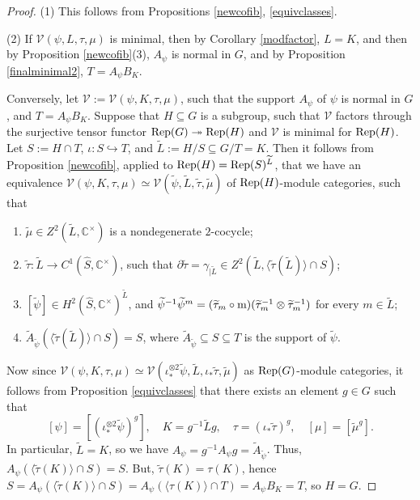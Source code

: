 \documentclass{amsart}
\theoremstyle{definition}
\newcommand{\Rep}{{\rm Rep}}
\newcommand{\V}{\mathscr{V}}
\newcommand{\ot}{\otimes}
\numberwithin{equation}{section}
\begin{document}
\begin{proof}
(1) This follows from Propositions \ref{newcofib}, \ref{equivclasses}.

(2) If $\V(\psi,L,\tau,\mu)$ is minimal, then by Corollary \ref{modfactor}, $L=K$, and then by Proposition \ref{newcofib}(3), $A_{\psi}$ is normal in $G$, and by Proposition \ref{finalminimal2}, $T=A_{\psi}B_K$.

Conversely, let $\V:=\V(\psi,K,\tau,\mu)$, such that the support $A_{\psi}$ of $\psi$ is normal in $G$, and $T=A_{\psi}B_K$. Suppose that $H\subseteq G$ is a subgroup, such that $\V$ factors through the surjective tensor functor $\Rep(G)\twoheadrightarrow \Rep(H)$ and $\V$ is minimal for $\Rep(H)$. Let $S:=H\cap T$, $\iota:S\hookrightarrow T$, and $\widetilde{L}:=H/S\subseteq G/T=K$. Then it follows from Proposition \ref{newcofib}, applied to $\Rep(H)=\Rep(S)^{\widetilde{L}}$, that we have an equivalence $\V(\psi,K,\tau,\mu)\simeq\V(\widetilde{\psi},\widetilde{L},\widetilde{\tau},\widetilde{\mu})$ of $\Rep(H)$-module categories, such that 
\begin{enumerate}
\item
$\widetilde{\mu}\in Z^2(\widetilde{L},\mathbb{C}^{\times})$ is a nondegenerate $2$-cocycle; 
\item
$\widetilde{\tau}: \widetilde{L}\to C^1(\widehat{S},\mathbb{C}^{\times})$,
such that $\partial\widetilde{\tau}=\gamma_{\mid \widetilde{L}}\in Z^2(\widetilde{L},\langle \widetilde{\tau}(\widetilde{L})\rangle\cap S)$;
\item
$[\widetilde{\psi}]\in H^2(\widehat{S},\mathbb{C}^{\times})^{\widetilde{L}}$, and $\widetilde{\psi}^{-1}\widetilde{\psi}^{m}=(\widetilde{\tau}_{m}\circ {\rm m})(\widetilde{\tau}_{m}^{-1}\ot \widetilde{\tau}_{m}^{-1})$ for every $m\in \widetilde{L}$;
\item
$\widetilde{A}_{\widetilde{\psi}}(\langle \widetilde{\tau}(\widetilde{L})\rangle\cap S)=S$, where $\widetilde{A}_{\widetilde{\psi}}\subseteq S\subseteq T$ is the support of $\widetilde{\psi}$. 
\end{enumerate}
Now since $\V(\psi,K,\tau,\mu)\simeq \V(\iota_*^{\ot 2}\widetilde{\psi},\widetilde{L},\iota_*\widetilde{\tau},\widetilde{\mu})$ as $\Rep(G)$-module categories, it follows from Proposition \ref{equivclasses} that there exists an element $g\in G$ such that
$$[\psi]=[(\iota_*^{\ot 2}\widetilde{\psi})^{g}],\quad K=g^{-1}\widetilde{L}g,\quad \tau=(\iota_*\widetilde{\tau})^g,\quad [\mu]=[\widetilde{\mu}^g].$$ 
In particular, $\widetilde{L}=K$, so we have $A_{\psi}=g^{-1}A_{\psi}g=\widetilde{A}_{\widetilde{\psi}}$. Thus, $A_{\psi}(\langle \widetilde{\tau}(K)\rangle\cap S)=S$. But, $\widetilde{\tau}(K)=\tau(K)$, hence $S=A_{\psi}(\langle \widetilde{\tau}(K)\rangle\cap S)=A_{\psi}(\langle \tau(K)\rangle\cap T)=A_{\psi}B_K=T$, so $H=G$.
\end{proof}
\end{document}
